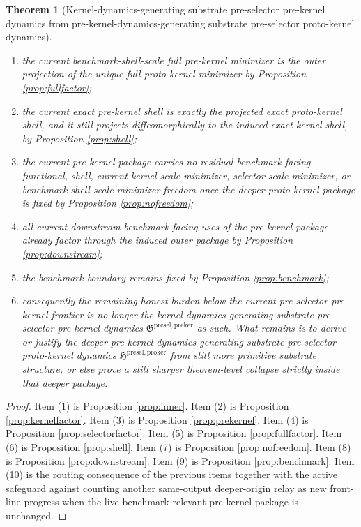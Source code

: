 \documentclass[11pt]{article}
\newcommand{\PreKernelPackage}{\mathfrak G^{\mathrm{presel,preker}}}
\newcommand{\ProtoKernelPackage}{\mathfrak H^{\mathrm{presel,proker}}}
\newtheorem{theorem}{Theorem}
\begin{document}
\begin{theorem}[Kernel-dynamics-generating substrate pre-selector pre-kernel dynamics from pre-kernel-dynamics-generating substrate pre-selector proto-kernel dynamics]
\begin{enumerate}
    \item the current benchmark-shell-scale full pre-kernel minimizer is the outer projection of the unique full proto-kernel minimizer by Proposition \ref{prop:fullfactor};
    \item the current exact pre-kernel shell is exactly the projected exact proto-kernel shell, and it still projects diffeomorphically to the induced exact kernel shell, by Proposition \ref{prop:shell};
    \item the current pre-kernel package carries no residual benchmark-facing functional, shell, current-kernel-scale minimizer, selector-scale minimizer, or benchmark-shell-scale minimizer freedom once the deeper proto-kernel package is fixed by Proposition \ref{prop:nofreedom};
    \item all current downstream benchmark-facing uses of the pre-kernel package already factor through the induced outer package by Proposition \ref{prop:downstream};
    \item the benchmark boundary remains fixed by Proposition \ref{prop:benchmark};
    \item consequently the remaining honest burden below the current pre-selector pre-kernel frontier is no longer the kernel-dynamics-generating substrate pre-selector pre-kernel dynamics \(\PreKernelPackage\) as such. What remains is to derive or justify the deeper pre-kernel-dynamics-generating substrate pre-selector proto-kernel dynamics \(\ProtoKernelPackage\) from still more primitive substrate structure, or else prove a still sharper theorem-level collapse strictly inside that deeper package.
\end{enumerate}
\end{theorem}

\begin{proof}
Item (1) is Proposition \ref{prop:inner}. Item (2) is Proposition \ref{prop:kernelfactor}. Item (3) is Proposition \ref{prop:prekernel}. Item (4) is Proposition \ref{prop:selectorfactor}. Item (5) is Proposition \ref{prop:fullfactor}. Item (6) is Proposition \ref{prop:shell}. Item (7) is Proposition \ref{prop:nofreedom}. Item (8) is Proposition \ref{prop:downstream}. Item (9) is Proposition \ref{prop:benchmark}. Item (10) is the routing consequence of the previous items together with the active safeguard against counting another same-output deeper-origin relay as new front-line progress when the live benchmark-relevant pre-kernel package is unchanged.
\end{proof}
\end{document}
